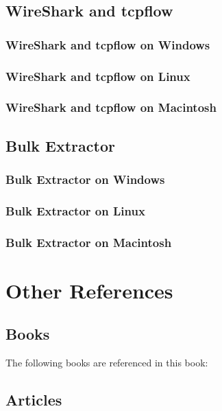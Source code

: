 \subsection{WireShark and tcpflow}

\subsubsection{WireShark and tcpflow on Windows}
\subsubsection{WireShark and tcpflow on Linux}
\subsubsection{WireShark and tcpflow on Macintosh}

\subsection{Bulk Extractor}

\subsubsection{Bulk Extractor on Windows}
\subsubsection{Bulk Extractor on Linux}
\subsubsection{Bulk Extractor on Macintosh}

\section{Other References}
\subsection{Books}\label{section:books}
The following books are referenced in this book:

\printbibliography[heading=bibempty,type=book]


\cite{carrier-file-systems}
\subsection{Articles}
